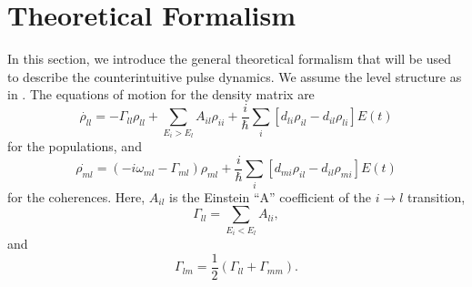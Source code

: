 \section{Theoretical Formalism}

\hspace{\parindent} In this section, we introduce the general theoretical
formalism that will be used to describe the counterintuitive pulse dynamics. 
We assume the level structure as in
.  The equations of motion for the density matrix
are \cite{Allen:82}
\begin{equation}
\dot{\rho_{ll}} = -\Gamma_{ll}\rho_{ll} + \sum_{E_i > E_l} A_{il}\rho_{ii}
+ \frac{i}{\hbar}\sum_{i} \left[d_{li}\rho_{il}-d_{il}\rho_{li}\right]E(t)
\end{equation}
for the populations, and
\begin{equation}
\dot{\rho_{ml}} = \left(-i\omega_{ml}-\Gamma_{ml}\right)\rho_{ml}
+\frac{i}{\hbar}\sum_{i}\left[d_{mi}\rho_{il} - d_{il}\rho_{mi}\right]E(t)
\end{equation}
for the coherences.  Here, $A_{il}$ is the Einstein ``A'' coefficient of the
$i \rightarrow l$ transition,
\begin{equation}
\Gamma_{ll} = \sum_{E_i < E_l}A_{li},
\end{equation}
and
\begin{equation}
\Gamma_{lm} = \frac{1}{2}\left(\Gamma_{ll} + \Gamma_{mm}\right).
\end{equation}

